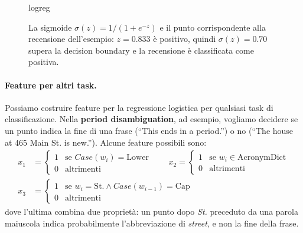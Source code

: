 \begin{figure}[htbp]
\centering
\begin{widget}{logreg}
\end{widget}
\caption{La sigmoide $\sigma(z) = 1/(1 + e^{-z})$ e il punto corrispondente alla recensione dell'esempio: $z = 0.833$ è positivo, quindi $\sigma(z) = 0.70$ supera la decision boundary e la recensione è classificata come positiva.}
\label{fig:sigmoide}
\end{figure}

\paragraph{Feature per altri task.} Possiamo costruire feature per la regressione logistica per qualsiasi task di classificazione. Nella \textbf{period disambiguation}, ad esempio, vogliamo decidere se un punto indica la fine di una frase (\enquote{This ends in a period.}) o no (\enquote{The house at 465 Main St. is new.}). Alcune feature possibili sono:
\begin{align*}
x_1 &= \begin{cases} 1 & \text{se } \mathit{Case}(w_i) = \text{Lower} \\ 0 & \text{altrimenti} \end{cases} \qquad
x_2 = \begin{cases} 1 & \text{se } w_i \in \text{AcronymDict} \\ 0 & \text{altrimenti} \end{cases} \\[4pt]
x_3 &= \begin{cases} 1 & \text{se } w_i = \text{St.} \wedge \mathit{Case}(w_{i-1}) = \text{Cap} \\ 0 & \text{altrimenti} \end{cases}
\end{align*}
dove l'ultima combina due proprietà: un punto dopo \textit{St.} preceduto da una parola maiuscola indica probabilmente l'abbreviazione di \textit{street}, e non la fine della frase.

